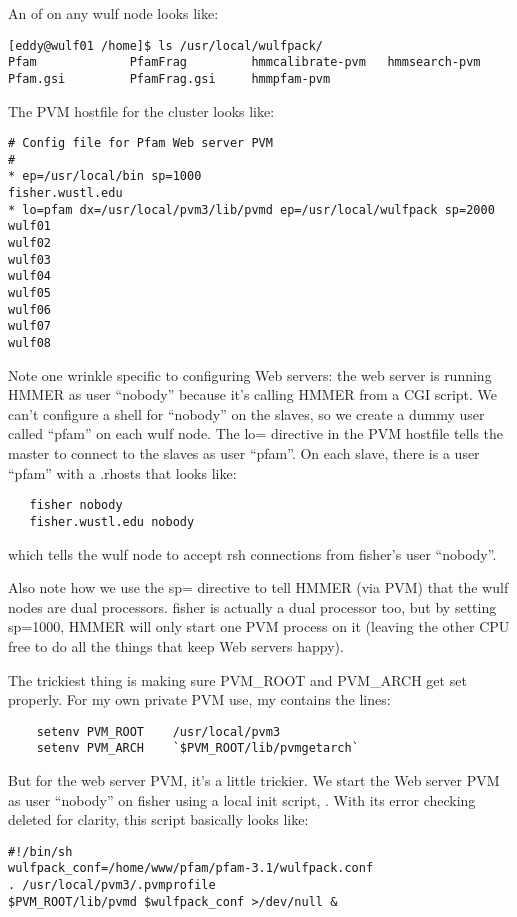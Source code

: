 An  of  on any wulf node looks like:
\begin{verbatim}
[eddy@wulf01 /home]$ ls /usr/local/wulfpack/
Pfam             PfamFrag         hmmcalibrate-pvm   hmmsearch-pvm
Pfam.gsi         PfamFrag.gsi     hmmpfam-pvm
\end{verbatim}

The PVM hostfile for the cluster looks like:
\begin{verbatim}
# Config file for Pfam Web server PVM
#
* ep=/usr/local/bin sp=1000
fisher.wustl.edu
* lo=pfam dx=/usr/local/pvm3/lib/pvmd ep=/usr/local/wulfpack sp=2000
wulf01
wulf02
wulf03
wulf04
wulf05
wulf06
wulf07
wulf08
\end{verbatim}

Note one wrinkle specific to configuring Web servers: the web server
is running HMMER as user ``nobody'' because it's calling HMMER from a
CGI script. We can't configure a shell for ``nobody'' on the slaves,
so we create a dummy user called ``pfam'' on each wulf node.  The lo=
directive in the PVM hostfile tells the master to connect to the
slaves as user ``pfam''. On each slave, there is a user ``pfam'' with
a .rhosts that looks like:
\begin{verbatim}
   fisher nobody
   fisher.wustl.edu nobody
\end{verbatim}
which tells the wulf node to accept rsh connections from
fisher's user ``nobody''.

Also note how we use the sp= directive to tell HMMER (via PVM) that
the wulf nodes are dual processors. fisher is actually a dual
processor too, but by setting sp=1000, HMMER will only start one PVM
process on it (leaving the other CPU free to do all the things that
keep Web servers happy).

The trickiest thing is making sure PVM\_ROOT and PVM\_ARCH get set
properly.  For my own private PVM use, my  contains the lines:
\begin{verbatim}
	setenv PVM_ROOT    /usr/local/pvm3
	setenv PVM_ARCH    `$PVM_ROOT/lib/pvmgetarch`
\end{verbatim}
But for the web server PVM, it's a little trickier. We start the Web
server PVM as user ``nobody'' on fisher using a local init script,
. With its error checking deleted for
clarity, this script basically looks like:

\begin{verbatim}
#!/bin/sh
wulfpack_conf=/home/www/pfam/pfam-3.1/wulfpack.conf
. /usr/local/pvm3/.pvmprofile
$PVM_ROOT/lib/pvmd $wulfpack_conf >/dev/null &
\end{verbatim}

